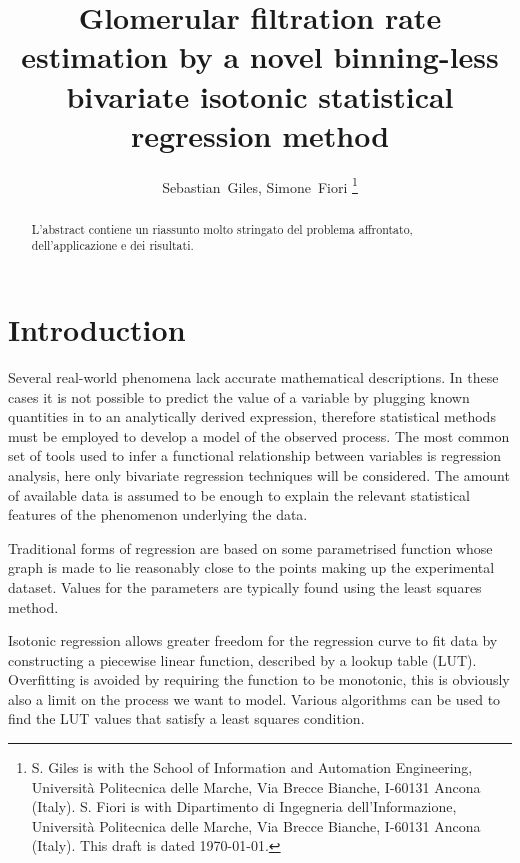 \documentclass[10pt,final]{siamltex}
\begin{document}
\title{Glomerular filtration rate estimation by a novel binning-less bivariate isotonic statistical regression method}
\author{Sebastian~Giles, Simone~Fiori%
\thanks{S. Giles is with the School of Information and Automation Engineering,
Universit\`{a} Politecnica delle Marche,
Via Brecce Bianche, I-60131 Ancona (Italy).
\newline\indent
S. Fiori is with Dipartimento di Ingegneria dell'Informazione,
Universit\`{a} Politecnica delle Marche,
Via Brecce Bianche, I-60131 Ancona (Italy).
\newline\indent
This draft is dated \today.}}
\maketitle
\def\bbbr{\mathbb{R}}
\def\bbbx{\mathbb{X}}
\def\bbby{\mathbb{Y}}
\def\mdef{{\stackrel{{\mathrm{def}}}{=}}}
\renewcommand*{\thefootnote}{\fnsymbol{footnote}}
\def\to{\mathbf{\ to\ }}
\setcounter{footnote}{1}
%
%
\begin{abstract}
  {\red L'abstract contiene un riassunto molto stringato del problema affrontato, dell'applicazione e dei risultati.}
\end{abstract}
%
\section{Introduction}
Several real-world phenomena lack accurate mathematical descriptions. In these cases it is not possible to predict the value of a variable by plugging known quantities in to an analytically derived expression, therefore statistical methods must be employed to develop a model of the observed process. The most common set of tools used to infer a functional relationship between variables is regression analysis, here only bivariate regression techniques will be considered. The amount of available data is assumed to be enough to explain the relevant statistical features of the phenomenon underlying the data.

Traditional forms of regression are based on some parametrised function whose graph is made to lie reasonably close to the points making up the experimental dataset. Values for the parameters are typically found using the least squares method.

Isotonic regression allows greater freedom for the regression curve to fit data by constructing a piecewise linear function, described by a lookup table (LUT). Overfitting is avoided by requiring the function to be monotonic, this is obviously also a limit on the process we want to model. Various algorithms can be used to find the LUT values that satisfy a least squares condition.
\end{document}
